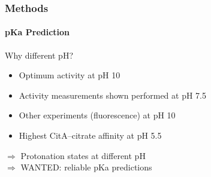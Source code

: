 \documentclass[english]{beamer}
\begin{document}

\begin{frame}
    \frametitle{Methods}
    \framesubtitle{pKa Prediction} 

    \begin{block}{Why different pH?}
        \begin{itemize}
            \item Optimum activity at pH 10
            \item Activity measurements shown performed at pH 7.5
            \item Other experiments (fluorescence) at pH 10
            \item Highest CitA--citrate affinity at pH 5.5
        \end{itemize}
    \end{block}

    \pause
    \vspace{0.5cm}

    \center
    $\Longrightarrow$ Protonation states at different pH \\
    $\Longrightarrow$ WANTED: reliable pKa predictions

\end{frame}

\end{document}
